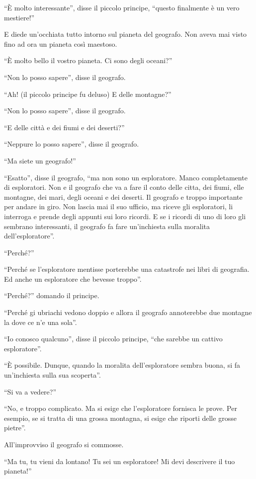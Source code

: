 \documentclass[11pt]{scrbook}
\begin{document}
``È molto interessante'', disse il piccolo principe, ``questo finalmente
è un vero mestiere!''

E diede un'occhiata tutto intorno sul pianeta del geografo. Non aveva
mai visto fino ad ora un pianeta così maestoso.

``È molto bello il vostro pianeta. Ci sono degli oceani?''

``Non lo posso sapere'', disse il geografo.

``Ah! (il piccolo principe fu deluso) E delle montagne?''

``Non lo posso sapere'', disse il geografo.

``E delle città e dei fiumi e dei deserti?''

``Neppure lo posso sapere'', disse il geografo.

``Ma siete un geografo!''

``Esatto'', disse il geografo, ``ma non sono un esploratore. Manco
completamente di esploratori. Non e il geografo che va a fare il conto
delle citta, dei fiumi, elle montagne, dei mari, degli oceani e dei
deserti. Il geografo e troppo importante per andare in giro. Non lascia
mai il suo ufficio, ma riceve gli esploratori, li interroga e prende
degli appunti sui loro ricordi. E se i ricordi di uno di loro gli
sembrano interessanti, il geografo fa fare un'inchiesta sulla moralita
dell'esploratore''.

``Perché?''

``Perché se l'esploratore mentisse porterebbe una catastrofe nei libri
di geografia. Ed anche un esploratore che bevesse troppo''.

``Perché?'' domando il principe.

``Perché gi ubriachi vedono doppio e allora il geografo annoterebbe due
montagne la dove ce n'e una sola''.

``Io conosco qualcuno'', disse il piccolo principe, ``che sarebbe un
cattivo esploratore''.

``È possibile. Dunque, quando la moralita dell'esploratore sembra buona,
si fa un'inchiesta sulla sua scoperta''.

``Si va a vedere?''

``No, e troppo complicato. Ma si esige che l'esploratore fornisca le
prove. Per esempio, se si tratta di una grossa montagna, si esige che
riporti delle grosse pietre''.

All'improvviso il geografo si commosse.

``Ma tu, tu vieni da lontano! Tu sei un esploratore! Mi devi descrivere
il tuo pianeta!''
\end{document}
